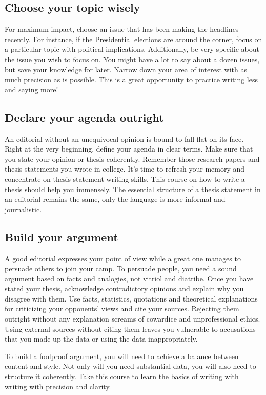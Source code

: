 \subsection{Choose your topic wisely}

For maximum impact, choose an issue that has been making the headlines recently. For instance, if the Presidential elections are around the corner, focus on a particular topic with political implications. Additionally, be very specific about the issue you wish to focus on. You might have a lot to say about a dozen issues, but save your knowledge for later. Narrow down your area of interest with as much precision as is possible. This is a great opportunity to practice writing less and saying more!

\subsection{Declare your agenda outright}

An editorial without an unequivocal opinion is bound to fall flat on its face. Right at the very beginning, define your agenda in clear terms. Make sure that you state your opinion or thesis coherently. Remember those research papers and thesis statements you wrote in college. It's time to refresh your memory and concentrate on thesis statement writing skills. This course on how to write a thesis should help you immensely. The essential structure of a thesis statement in an editorial remains the same, only the language is more informal and journalistic.

\subsection{Build your argument}
A good editorial expresses your point of view while a great one manages to persuade others to join your camp. To persuade people, you need a sound argument based on facts and analogies, not vitriol and diatribe. Once you have stated your thesis, acknowledge contradictory opinions and explain why you disagree with them. Use facts, statistics, quotations and theoretical explanations for criticizing your opponents' views and cite your sources. Rejecting them outright without any explanation screams of cowardice and unprofessional ethics. Using external sources without citing them leaves you vulnerable to accusations that you made up the data or using the data inappropriately. 

To build a foolproof argument, you will need to achieve a balance between content and style. Not only will you need substantial data, you will also need to structure it coherently. Take this course to learn the basics of writing with writing with precision and clarity.


